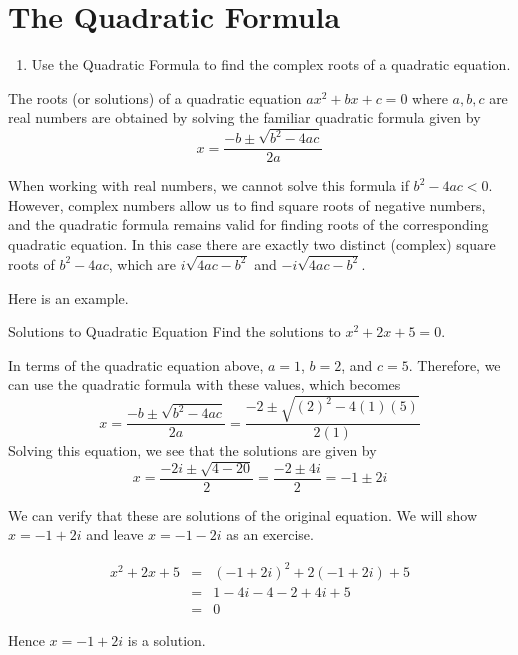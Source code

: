 \section{The Quadratic Formula}

\begin{outcome}
\begin{enumerate}
\item[A.] Use the Quadratic Formula to find the complex roots of a quadratic equation. 
\end{enumerate}
\end{outcome}

The roots (or solutions) of a quadratic equation $ax^{2}+bx+c=0$ where $a,b,c$ are real numbers are
obtained by solving the familiar quadratic formula
given by 
\begin{equation*}
x=
\frac{-b\pm \sqrt{b^{2}-4ac}}{2a}
\end{equation*}

When working with real numbers, we cannot solve this formula if
$b^{2}-4ac<0.$ However, complex numbers allow us to find square roots
of negative numbers, and the quadratic formula remains valid for
finding roots of the corresponding quadratic equation.   In this case
there are exactly two distinct (complex) square roots of $b^{2}-4ac$, which are 
$i\sqrt{4ac-b^{2}}$ and $-i\sqrt{4ac-b^{2}}$.

Here is an example. 

\begin{example}{Solutions to Quadratic Equation}\label{exa:quadraticequation}
Find the solutions to $x^{2}+2x+5=0$.
\end{example}

\begin{solution}
In terms of the quadratic equation above, $a=1$, $b=2$, and $c=5$.
Therefore, we can use the quadratic formula with these values, which becomes
\begin{equation*}
x=
\frac{-b\pm \sqrt{b^{2}-4ac}}{2a}
= 
\frac{-2 \pm \sqrt{\left(2\right)^{2} - 4 (1)(5)}}{2(1)}
\end{equation*}
Solving this equation, we see that the solutions are given by
\begin{equation*}
x=\frac{-2i\pm \sqrt{4-20}}{2}=\frac{-2\pm 4i}{2}=-1\pm 2i
\end{equation*}

We can verify that these are solutions of the original equation. 
We will show $x = -1+2i$ and leave $x = -1-2i$ as an exercise.

\begin{eqnarray*}
x^{2}+2x+5
&=& (-1+2i)^2 + 2(-1+2i) + 5 \\
&=& 1 - 4i - 4 -2 + 4i + 5 \\
&=& 0
\end{eqnarray*}

Hence $x = -1+2i$ is a solution. 
\end{solution}


